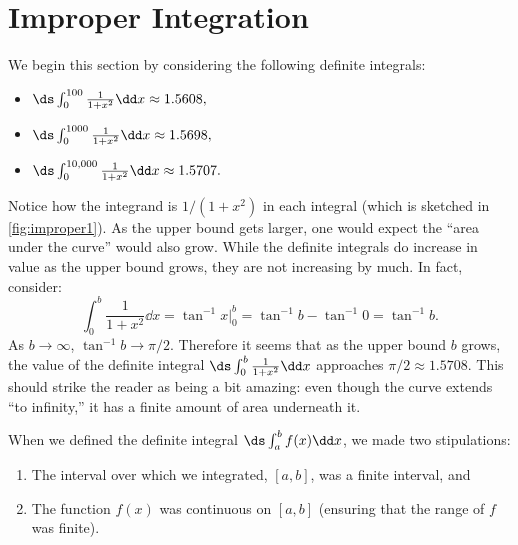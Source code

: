 \section{Improper Integration}\label{sec:improper_integration}

We begin this section by considering the following definite integrals:
\begin{itemize}
\item	$\ds \int_0^{100}\frac1{1+x^2}\dd x \approx 1.5608,$
\item	$\ds \int_0^{1000}\frac1{1+x^2}\dd x \approx 1.5698,$
\item	$\ds \int_0^{10,000}\frac1{1+x^2}\dd x \approx 1.5707.$
\end{itemize}

Notice how the integrand is $1/(1+x^2)$ in each integral (which is sketched in \autoref{fig:improper1}). As the upper bound gets larger, one would expect the ``area under the curve'' would also grow. While the definite integrals do increase in value as the upper bound grows, they are not  increasing by much. In fact, consider:
\[\int_0^b \frac{1}{1+x^2}\dd x = \tan^{-1}x\Big|_0^b = \tan^{-1}b-\tan^{-1}0 = \tan^{-1}b.\]
As $b\rightarrow \infty$, $\tan^{-1}b \rightarrow \pi/2.$ Therefore it seems that as the upper bound $b$ grows, the value of the definite integral $\ds \int_0^b\frac{1}{1+x^2}\dd x$ approaches $\pi/2\approx 1.5708$. This should strike the reader as being a bit amazing: even though the curve extends ``to infinity,'' it has a finite amount of area underneath it.


When we defined the definite integral $\ds\int_a^b f(x)\dd x$, we made two stipulations:
	\begin{enumerate}
	\item		The interval over which we integrated, $[a,b]$, was a finite interval, and
	\item		The function $f(x)$ was continuous on $[a,b]$ (ensuring that the range of $f$ was finite).
	\end{enumerate}
	
